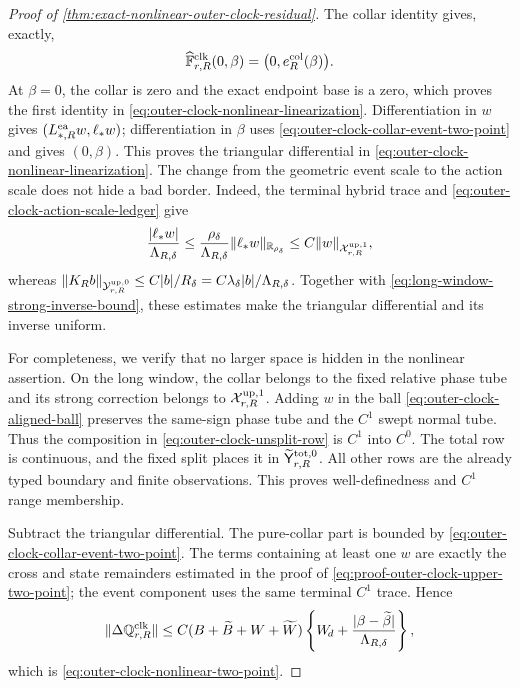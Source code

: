 \begin{proof}[Proof of
\cref{thm:exact-nonlinear-outer-clock-residual}]
The collar identity gives, exactly,
\begin{equation}
 \widehat{\mathbb F}_{r,R}^{\rm clk}(0,\beta)
 =\bigl(0,e_R^{\rm col}(\beta)\bigr).            \label{eq:proof-outer-clock-pure-collar-residual}
\end{equation}
At \(\beta=0\), the collar is zero and the exact endpoint base is a zero,
which proves the first identity in
\cref{eq:outer-clock-nonlinear-linearization}.  Differentiation in \(w\)
gives \((L_{*,R}^{\rm ea}w,\ell_*w)\); differentiation in \(\beta\)
uses \cref{eq:outer-clock-collar-event-two-point} and gives \((0,\beta)\).
This proves the triangular differential in
\cref{eq:outer-clock-nonlinear-linearization}.  The change from the
geometric event scale to the action scale does not hide a bad border.
Indeed, the terminal hybrid trace and
\cref{eq:outer-clock-action-scale-ledger} give
\begin{equation}
 \frac{|\ell_*w|}{\Lambda_{R,\delta}}
 \le \frac{\rho_\delta}{\Lambda_{R,\delta}}
       \|\ell_*w\|_{\mathbb R_{\rho_\delta}}
 \le C\|w\|_{\mathcal X_{r,R}^{\rm up,1}},       \label{eq:proof-outer-clock-action-event-border}
\end{equation}
whereas
\(\|K_Rb\|_{\mathcal Y_{r,R}^{\rm up,0}}
 \le C|b|/R_\delta
 =C\lambda_\delta|b|/\Lambda_{R,\delta}\).
Together with \cref{eq:long-window-strong-inverse-bound}, these estimates
make the triangular differential and its inverse uniform.

For completeness, we verify that no larger space is hidden in the
nonlinear assertion.  On the long window, the collar belongs to the
fixed relative phase tube and its strong correction belongs to
\(\mathcal X_{r,R}^{\rm up,1}\).  Adding \(w\) in the ball
\cref{eq:outer-clock-aligned-ball} preserves the same-sign phase tube and
the \(C^1\) swept normal tube.  Thus the composition in
\cref{eq:outer-clock-unsplit-row} is \(C^1\) into \(C^0\).
The total row is continuous, and the fixed split places it in
\(\widetilde{\mathsf Y}_{r,R}^{\rm tot,0}\).  All other rows are the
already typed boundary and finite observations.  This proves
well-definedness and \(C^1\) range membership.

Subtract the triangular differential.  The pure-collar part is bounded
by \cref{eq:outer-clock-collar-event-two-point}.  The terms containing
at least one \(w\) are exactly the cross and state remainders estimated
in the proof of
\cref{eq:proof-outer-clock-upper-two-point}; the event component uses the
same terminal \(C^1\) trace.  Hence
\[
 \|\Delta\mathbb Q_{r,R}^{\rm clk}\|
 \le C(B+\widetilde B+W+\widetilde W)
       \left\{W_{\!d}
          +\frac{|\beta-\widetilde\beta|}
                 {\Lambda_{R,\delta}}\right\},
\]
which is \cref{eq:outer-clock-nonlinear-two-point}.


\end{proof}
